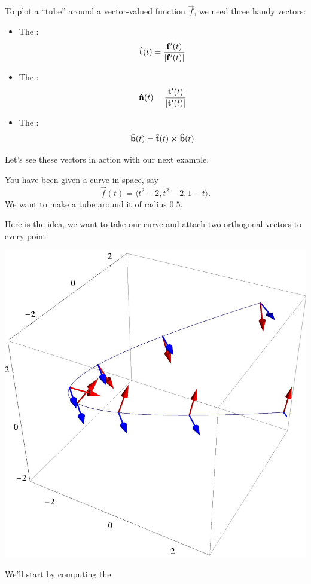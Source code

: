 \documentclass{ximera}
\begin{document}
To plot a ``tube'' around a vector-valued function $\vec{f}$, we need
three handy vectors:
\begin{itemize}
\item The :
  \[
  \mathbf{\hat{t}}(t) = \frac{\mathbf{f}'(t)}{|\mathbf{f}'(t)|}
  \]
\item The :
  \[
  \mathbf{\hat{n}}(t) = \frac{\mathbf{t}'(t)}{|\mathbf{t}'(t)|}
  \]
\item The :
  \[
  \mathbf{\hat{b}}(t) = \mathbf{\hat{t}}(t) \boldsymbol\times \mathbf{\hat{b}}(t)
  \]
\end{itemize}

Let's see these vectors in action with our next example.

\begin{example}
  You have been given a curve in space, say
  \[
  \vec{f}(t) = \langle t^2-2, t^2-2, 1-t\rangle.
  \]
  We want to make a tube around it of radius $0.5$.
  \begin{explanation}
    Here is the idea, we want to take our curve and attach two
    orthogonal vectors to every point
    \begin{image}
      \includegraphics{paraArrows.jpg}
    \end{image}
    We'll start by computing the

\end{explanation}
\end{example}
\end{document}
